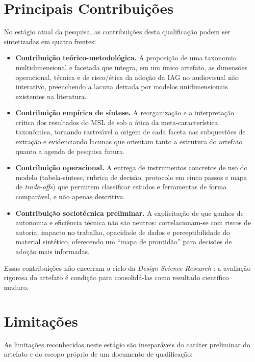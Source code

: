 \section{Principais Contribuições}

No estágio atual da pesquisa, as contribuições desta qualificação podem ser sintetizadas em quatro frentes:

\begin{itemize}
    \item \textbf{Contribuição teórico-metodológica.} A proposição de uma taxonomia multidimensional e facetada que integra, em um único artefato, as dimensões operacional, técnica e de risco/ética da adoção da IAG no audiovisual não interativo, preenchendo a lacuna deixada por modelos unidimensionais existentes na literatura.

    \item \textbf{Contribuição empírica de síntese.} A reorganização e a interpretação crítica dos resultados do MSL de \citet{RothAleo2026} sob a ótica da meta-característica taxonômica, tornando rastreável a origem de cada faceta nas subquestões de extração e evidenciando lacunas que orientam tanto a estrutura do artefato quanto a agenda de pesquisa futura.

    \item \textbf{Contribuição operacional.} A entrega de instrumentos concretos de uso do modelo (tabela-síntese, rubrica de decisão, protocolo em cinco passos e mapa de \textit{trade-offs}) que permitem classificar estudos e ferramentas de forma comparável, e não apenas descritiva.

    \item \textbf{Contribuição sociotécnica preliminar.} A explicitação de que ganhos de autonomia e eficiência técnica não são neutros: correlacionam-se com riscos de autoria, impacto no trabalho, opacidade de dados e perceptibilidade do material sintético, oferecendo um ``mapa de prontidão'' para decisões de adoção mais informadas.
\end{itemize}

Essas contribuições não encerram o ciclo da \textit{Design Science Research} \citep{hevner2004}: a avaliação rigorosa do artefato é condição para consolidá-las como resultado científico maduro.

\section{Limitações}

As limitações reconhecidas neste estágio são inseparáveis do caráter preliminar do artefato e do escopo próprio de um documento de qualificação:


